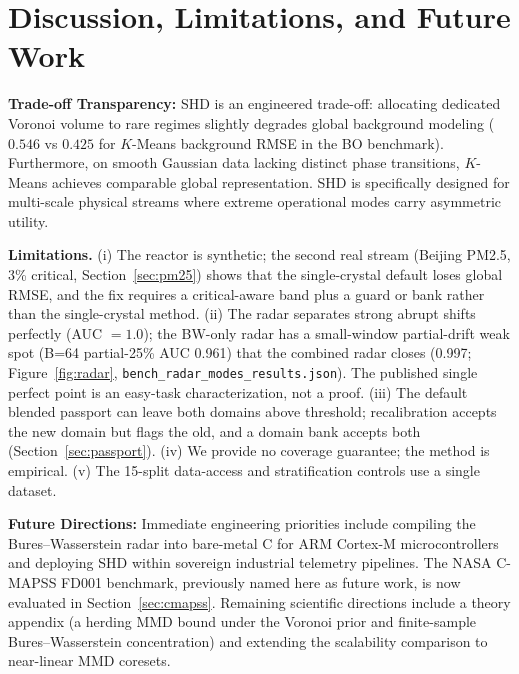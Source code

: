\documentclass[11pt,a4paper]{article}
\begin{document}
\section{Discussion, Limitations, and Future Work}

\textbf{Trade-off Transparency:} SHD is an engineered trade-off: allocating dedicated Voronoi volume to rare regimes slightly degrades global background modeling ($0.546$ vs $0.425$ for $K$-Means background RMSE in the BO benchmark). Furthermore, on smooth Gaussian data lacking distinct phase transitions, $K$-Means achieves comparable global representation. SHD is specifically designed for multi-scale physical streams where extreme operational modes carry asymmetric utility.

\textbf{Limitations.} (i) The reactor is synthetic; the second real stream (Beijing PM2.5, 3\% critical, Section~\ref{sec:pm25}) shows that the single-crystal default loses global RMSE, and the fix requires a critical-aware band plus a guard or bank rather than the single-crystal method. (ii) The radar separates strong abrupt shifts perfectly (AUC $=1.0$); the BW-only radar has a small-window partial-drift weak spot (B=64 partial-25\% AUC 0.961) that the combined radar closes (0.997; Figure~\ref{fig:radar}, \texttt{bench\_radar\_modes\_results.json}). The published single perfect point is an easy-task characterization, not a proof. (iii) The default blended passport can leave both domains above threshold; recalibration accepts the new domain but flags the old, and a domain bank accepts both (Section~\ref{sec:passport}). (iv) We provide no coverage guarantee; the method is empirical. (v) The 15-split data-access and stratification controls use a single dataset.

\textbf{Future Directions:} Immediate engineering priorities include compiling the Bures--Wasserstein radar into bare-metal C for ARM Cortex-M microcontrollers and deploying SHD within sovereign industrial telemetry pipelines. The NASA C-MAPSS FD001 benchmark, previously named here as future work, is now evaluated in Section~\ref{sec:cmapss}. Remaining scientific directions include a theory appendix (a herding MMD bound under the Voronoi prior and finite-sample Bures--Wasserstein concentration) and extending the scalability comparison to near-linear MMD coresets.



\end{document}
